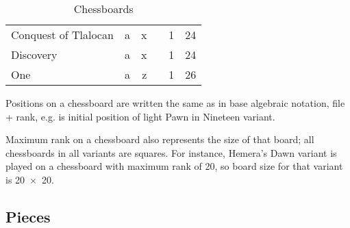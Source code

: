 \begin{table}[!h]
\begin{tabular}{ lrrcrr }
Conquest of Tlalocan  & a          & x                       &   & 1          & 24                        \\
Discovery             & a          & x                       &   & 1          & 24                        \\
One                   & a          & z                       &   & 1          & 26                        \\
\bottomrule %
\end{tabular}
\caption{Chessboards}
\label{tbl:Appendix/Introduction/Chessboards}
\end{table}

Positions on a chessboard are written the same as in base algebraic notation, file + rank,
e.g.  is initial position of light Pawn in Nineteen variant.

Maximum rank on a chessboard also represents the size of that board; all chessboards in all
variants are squares. For instance, Hemera's Dawn variant is played on a chessboard with
maximum rank of 20, so board size for that variant is \mbox{20 $\times$ 20}.

\clearpage %

\subsection*{Pieces}
\label{sec:Appendix/Introduction/Pieces}

